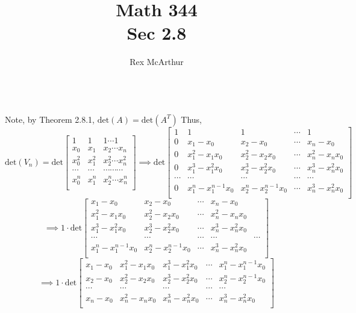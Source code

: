 \documentclass[letterpaper,12pt]{article}
\title{Math 344\\Sec 2.8}
\author{Rex McArthur}
\theoremstyle{definition}
\begin{document}
\maketitle

\\
Note, by Theorem 2.8.1, $\text{det}(A) = \text{det}(A^T)$ Thus,
\[ \text{det}(V_n) = \text{det}
\begin{bmatrix}
    1 & 1 & 1 \cdots 1 \\ 
    x_0 & x_1 & x_2 \cdots x_n \\ 
    x_0^2 & x_1^2 & x_2^2 \cdots x_n^2 \\ 
    \cdots & \cdots & \cdots \cdots \cdots \\ 
    x_0^n & x_1^n & x_2^n \cdots x_n^n \\ 
\end{bmatrix} 
\implies
\text{det}
\begin{bmatrix}
    1 & 1 & 1 &\cdots& 1 \\ 
    0 & x_1 - x_0 & x_2 - x_0 &\cdots& x_n - x_0 \\ 
    0 & x_1^2 - x_1x_0 & x_2^2 - x_2x_0 &\cdots &x_n^2 - x_nx_0  \\ 
    0 & x_1^3 - x_1^2x_0 & x_2^3 - x_2^2x_0 &\cdots &x_n^3 - x_n^2x_0  \\ 
    \cdots & \cdots & \cdots& \cdots &\cdots \\ 
    0 & x_1^n - x_1^{n-1}x_0 & x_2^n - x_2^{n-1}x_0&\cdots& x_n^3 - x_n^2x_0  \\ 
\end{bmatrix} 
\]
\[ 
\implies
1\cdot\text{det}
\begin{bmatrix}
    x_1 - x_0 & x_2 - x_0 &\cdots& x_n - x_0 \\ 
    x_1^2 - x_1x_0 & x_2^2 - x_2x_0 &\cdots &x_n^2 - x_nx_0  \\ 
    x_1^3 - x_1^2x_0 & x_2^3 - x_2^2x_0 &\cdots &x_n^3 - x_n^2x_0  \\ 
    \cdots & \cdots & \cdots& \cdots &\cdots \\ 
    x_1^n - x_1^{n-1}x_0 & x_2^n - x_2^{n-1}x_0&\cdots& x_n^3 - x_n^2x_0  \\ 
\end{bmatrix}
\]
\[
\implies
1\cdot\text{det}
\begin{bmatrix}
    x_1 - x_0 & x_1^2 - x_1x_0 &x_1^3 - x_1^2x_0 &\cdots &x_1^n - x_1^{n-1}x_0\\
    x_2 - x_0 &x_2^2 - x_2x_0 &x_2^3 - x_2^2x_0 &\cdots & x_2^n - x_2^{n-1}x_0\\
    \cdots&\cdots&\cdots &\cdots &\cdots\\
    x_n - x_0 &x_n^2 - x_nx_0& x_n^3 - x_n^2x_0 &\cdots & x_n^3 - x_n^2x_0 \\ 
\end{bmatrix}
\]
\end{document}
